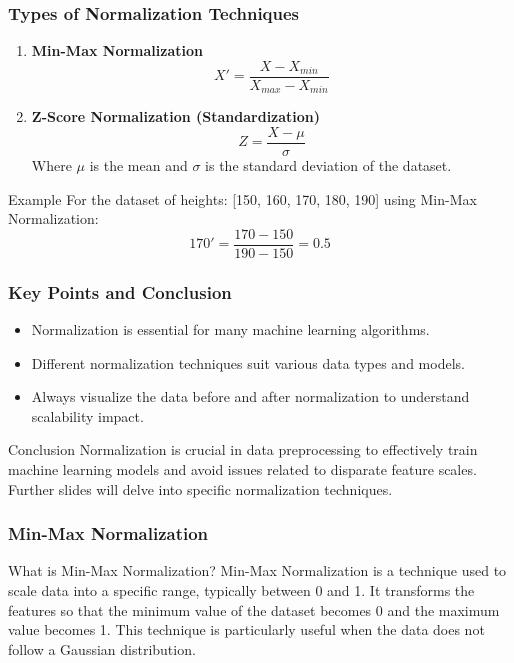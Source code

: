 \documentclass[aspectratio=169]{beamer}
\begin{document}
\begin{frame}[fragile]
    \frametitle{Types of Normalization Techniques}
    \begin{enumerate}
        \item \textbf{Min-Max Normalization}
        \begin{equation}
        X' = \frac{X - X_{min}}{X_{max} - X_{min}}
        \end{equation}
        
        \item \textbf{Z-Score Normalization (Standardization)}
        \begin{equation}
        Z = \frac{X - \mu}{\sigma}
        \end{equation}
        Where $\mu$ is the mean and $\sigma$ is the standard deviation of the dataset.
    \end{enumerate}
    
    \begin{block}{Example}
        For the dataset of heights: [150, 160, 170, 180, 190] using Min-Max Normalization:
        \begin{equation}
        170' = \frac{170 - 150}{190 - 150} = 0.5
        \end{equation}
    \end{block}
\end{frame}

\begin{frame}[fragile]
    \frametitle{Key Points and Conclusion}
    \begin{itemize}
        \item Normalization is essential for many machine learning algorithms.
        \item Different normalization techniques suit various data types and models.
        \item Always visualize the data before and after normalization to understand scalability impact.
    \end{itemize}
    
    \begin{block}{Conclusion}
        Normalization is crucial in data preprocessing to effectively train machine learning models and avoid issues related to disparate feature scales. Further slides will delve into specific normalization techniques.
    \end{block}
\end{frame}

\begin{frame}[fragile]
    \frametitle{Min-Max Normalization}
    \begin{block}{What is Min-Max Normalization?}
        Min-Max Normalization is a technique used to scale data into a specific range, typically between 0 and 1. 
        It transforms the features so that the minimum value of the dataset becomes 0 and the maximum value becomes 1. 
        This technique is particularly useful when the data does not follow a Gaussian distribution.
    \end{block}
\end{frame}
\end{document}
